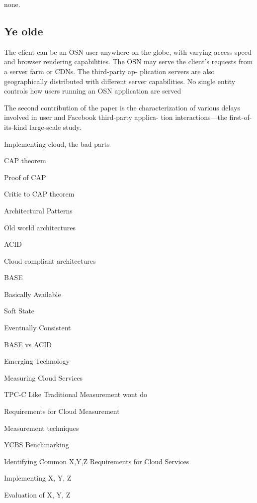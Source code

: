 \documentclass{tktltiki}
\begin{document}
none.


\subsection{Ye olde}




The client can be an OSN user anywhere on the globe, with varying access speed and browser rendering capabilities. The OSN may serve the client’s requests from a server farm or CDNs. The third-party ap- plication servers are also geographically distributed with different server capabilities. No single entity controls how users running an OSN application are served

The second contribution of the paper is the characterization of
various delays involved in user and Facebook third-party applica- tion interactions—the first-of-its-kind large-scale study.





Implementing cloud, the bad parts

CAP theorem

Proof of CAP

Critic to CAP theorem

Architectural Patterns

Old world architectures

ACID

Cloud compliant architectures

BASE

Basically Available

Soft State

Eventually Consistent

BASE vs ACID

Emerging Technology

Measuring Cloud Services

TPC-C Like Traditional Measurement wont do

Requirements for Cloud Measurement

Measurement techniques

YCBS Benchmarking

Identifying Common X,Y,Z Requirements for Cloud Services

Implementing X, Y, Z

Evaluation of X, Y, Z








    
\end{document}
